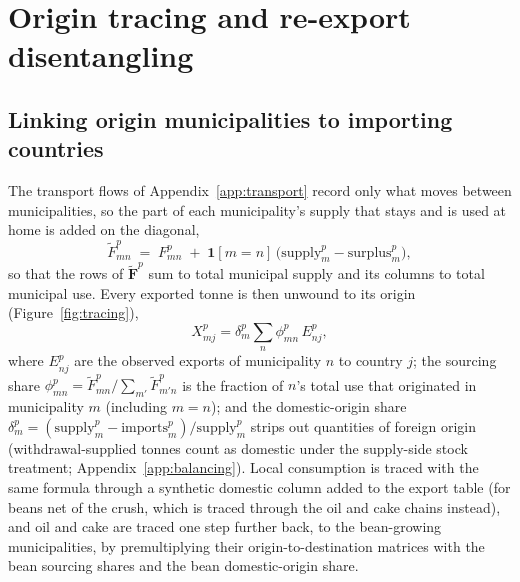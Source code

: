 \documentclass[pdflatex,sn-nature]{sn-jnl}%
\begin{document}
\section{Origin tracing and re-export disentangling}\label{app:tracing}

\subsection{Linking origin municipalities to importing countries}\label{subsubsec:exportlink}
The transport flows of Appendix~\ref{app:transport} record only what
moves between municipalities, so the part of each municipality's supply
that stays and is used at home is added on the diagonal,
\begin{equation}\label{eq:augment}
  \tilde F^p_{mn} \;=\; F^p_{mn} \;+\;
  \mathbf{1}[m=n]\,\big(\text{supply}^p_m-\text{surplus}^p_m\big),
\end{equation}
so that the rows of $\tilde{\mathbf{F}}^p$ sum to total municipal supply
and its columns to total municipal use. Every exported tonne is then
unwound to its origin (Figure~\ref{fig:tracing}),
\begin{equation}\label{eq:src2exp}
  X^p_{mj}=\delta^p_m\sum_{n}\phi^p_{mn}\,E^p_{nj},
\end{equation}
where $E^p_{nj}$ are the observed exports of municipality $n$ to country
$j$; the sourcing share
$\phi^p_{mn}=\tilde F^p_{mn}/\sum_{m'}\tilde F^p_{m'n}$ is the fraction
of $n$'s total use that originated in municipality $m$ (including $m=n$);
and the domestic-origin share
$\delta^p_m=(\text{supply}^p_m-\text{imports}^p_m)/\text{supply}^p_m$
strips out quantities of foreign origin (withdrawal-supplied tonnes count as
domestic under the supply-side stock treatment;
Appendix~\ref{app:balancing}).
Local consumption is traced with the same formula through a synthetic
domestic column added to the export table (for beans net of the crush, which
is traced through the oil and cake chains instead), and oil and cake are
traced one step further back, to the bean-growing municipalities, by
premultiplying their origin-to-destination matrices with the bean sourcing
shares and the bean domestic-origin share.
\end{document}
